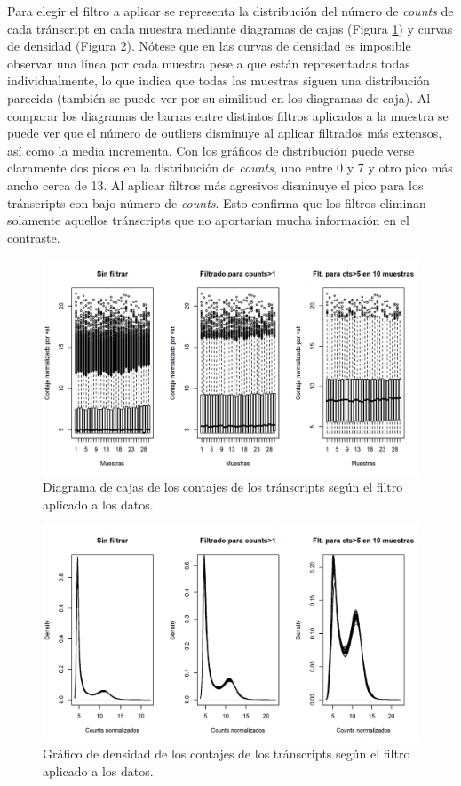 \documentclass[
]{article}
\begin{document}
Para elegir el filtro a aplicar se representa la distribución del número
de \emph{counts} de cada tránscript en cada muestra mediante diagramas
de cajas (Figura \ref{fig:Fig1}) y curvas de densidad (Figura
\ref{fig:Fig2}). Nótese que en las curvas de densidad es imposible
observar una línea por cada muestra pese a que están representadas todas
individualmente, lo que indica que todas las muestras siguen una
distribución parecida (también se puede ver por su similitud en los
diagramas de caja). Al comparar los diagramas de barras entre distintos
filtros aplicados a la muestra se puede ver que el número de outliers
disminuye al aplicar filtrados más extensos, así como la media
incrementa. Con los gráficos de distribución puede verse claramente dos
picos en la distribución de \emph{counts}, uno entre 0 y 7 y otro pico
más ancho cerca de 13. Al aplicar filtros más agresivos disminuye el
pico para los tránscripts con bajo número de \emph{counts}. Esto
confirma que los filtros eliminan solamente aquellos tránscripts que no
aportarían mucha información en el contraste.

\begin{figure}

{\centering \includegraphics[width=0.8\linewidth]{results/1.Filtraje/1.FiltComp} 

}

\caption{Diagrama de cajas de los contajes de los tránscripts según el filtro aplicado a los datos.}\label{fig:Fig1}
\end{figure}

\begin{figure}

{\centering \includegraphics[width=0.8\linewidth]{results/1.Filtraje/2.FiltDens} 

}

\caption{Gráfico de densidad de los contajes de los tránscripts según el filtro aplicado a los datos.}\label{fig:Fig2}
\end{figure}
\end{document}
